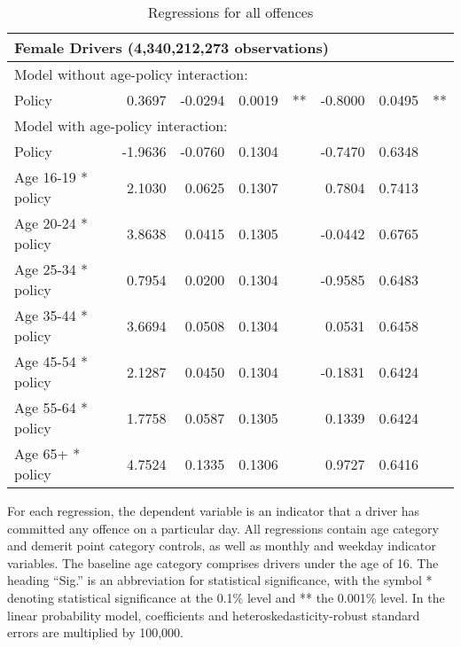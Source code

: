 \begin{table}
\begin{tabular}{l r r r l r r l}
\hline 

\multicolumn{7}{l}{\textbf{Female Drivers} (4,340,212,273 observations)} \\ 

\hline
\multicolumn{7}{l}{Model without age-policy interaction: } \\ 
Policy                   &  0.3697       &  -0.0294        &  0.0019       &   **       &  -0.8000        &  0.0495       &   **       \\ 
\hline
\multicolumn{7}{l}{Model with age-policy interaction: } \\ 
Policy                   &  -1.9636       &  -0.0760        &  0.1304       &            &  -0.7470        &  0.6348       &            \\ 
Age 16-19 * policy   &  2.1030       &  0.0625        &  0.1307       &            &  0.7804        &  0.7413       &            \\ 
Age 20-24 * policy   &  3.8638       &  0.0415        &  0.1305       &            &  -0.0442        &  0.6765       &            \\ 
Age 25-34 * policy   &  0.7954       &  0.0200        &  0.1304       &            &  -0.9585        &  0.6483       &            \\ 
Age 35-44 * policy   &  3.6694       &  0.0508        &  0.1304       &            &  0.0531        &  0.6458       &            \\ 
Age 45-54 * policy   &  2.1287       &  0.0450        &  0.1304       &            &  -0.1831        &  0.6424       &            \\ 
Age 55-64 * policy   &  1.7758       &  0.0587        &  0.1305       &            &  0.1339        &  0.6424       &            \\ 
Age 65+ * policy   &  4.7524       &  0.1335        &  0.1306       &            &  0.9727        &  0.6416       &            \\ 

\hline 

\end{tabular} 
\caption{Regressions for all offences} 
For each regression, the dependent variable is an indicator that a driver has committed  
any offence on a particular day.  
All regressions contain age category and demerit point category controls, 
as well as monthly and weekday indicator variables. 
The baseline age category comprises drivers under the age of 16. 
The heading ``Sig.'' is an abbreviation for statistical significance, with 
the symbol * denoting statistical significance at the 0.1\% level 
and ** the 0.001\% level. 
In the linear probability model, coefficients and heteroskedasticity-robust standard errors are  
multiplied by 100,000.  
\label{tab:seas_Logit_vs_LPMx100K_regs} 
\end{table} 
 
